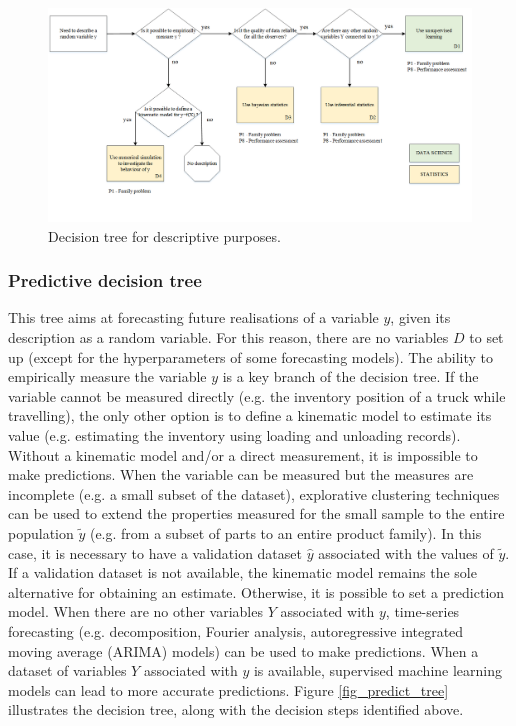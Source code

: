 \begin{landscape}
\thispagestyle{empty}
\begin{figure}[hbt!]
\centering
\includegraphics[width=1.5\textwidth]{SectionIntroduction/dataDrivenDecisions_fig/fig_describe_tree.png}
\captionsetup{type=figure}
\caption{Decision tree for descriptive purposes.}
\label{fig_describe_tree}
\vfill
\end{figure}
\end{landscape}




\subsubsection{Predictive decision tree}

This tree aims at forecasting future realisations of a variable $y$, given its description as a random variable. For this reason, there are no variables $D$ to set up (except for the hyperparameters of some forecasting models). The ability to empirically measure the variable $y$ is a key branch of the decision tree. If the variable cannot be measured directly (e.g. the inventory position of a truck while travelling), the only other option is to define a kinematic model to estimate its value (e.g. estimating the inventory using loading and unloading records). Without a kinematic model and/or a direct measurement, it is impossible to make predictions. When the variable can be measured but the measures are incomplete (e.g. a small subset of the dataset), explorative clustering techniques can be used to extend the properties measured for the small sample to the entire population $\widetilde{y}$ (e.g. from a subset of parts to an entire product family). In this case, it is necessary to have a validation dataset $\hat{y}$ associated with the values of $\widetilde{y}$. If a validation dataset is not available, the kinematic model remains the sole alternative for obtaining an estimate. Otherwise, it is possible to set a prediction model. When there are no other variables $Y$ associated with $y$, time-series forecasting (e.g. decomposition, Fourier analysis, autoregressive integrated moving average (ARIMA) models) can be used to make predictions. When a dataset of variables $Y$ associated with $y$ is available, supervised machine learning models can lead to more accurate predictions. Figure \ref{fig_predict_tree} illustrates the decision tree, along with the decision steps identified above.

